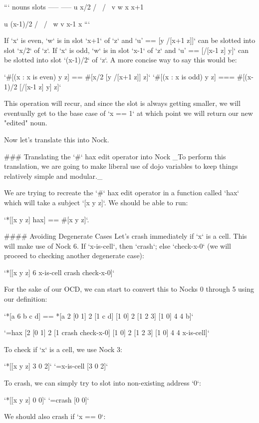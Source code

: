 \documentclass[twoside]{article}
\begin{document}
```
nouns          slots
-----          -----
  u             x/2
 / \            / \ 
v   w          x  x+1

  u           (x-1)/2
 / \            / \
w   v         x-1  x
```

If `x` is even, `w` is in slot `x+1` of `z` and `u' == [y /[x+1 z]]` can be slotted into slot `x/2` of `z`. If `x` is odd, `w` is in slot `x-1` of `z` and `u' == [/[x-1 z] y]` can be slotted into slot `(x-1)/2` of `z`. A more concise way to say this would be:

`#[(x : x is even) y z] == #[x/2 [y /[x+1 z]] z]`  
`#[(x : x is odd) y z] === #[(x-1)/2 [/[x-1 z] y] z]`  

This operation will recur, and since the slot is always getting smaller, we will eventually get to the base case of `x == 1` at which point we will return our new "edited" noun.

Now let's translate this into Nock.

### Translating the `#` hax edit operator into Nock
_To perform this translation, we are going to make liberal use of dojo variables to keep things relatively simple and modular._

We are trying to recreate the `#` hax edit operator in a function called `hax` which will take a subject `[x y z]`.  We should be able to run:

`*[[x y z] hax] == #[x y z]`.


#### Avoiding Degenerate Cases
Let's crash immediately if `x` is a cell. This will make use of Nock 6. If `x-is-cell`, then `crash`; else `check-x-0` (we will proceed to checking another degenerate case):

`*[[x y z] 6 x-is-cell crash check-x-0]`

For the sake of our OCD, we can start to convert this to Nocks 0 through 5 using our definition:

`*[a 6 b c d] == *[a 2 [0 1] 2 [1 c d] [1 0] 2 [1 2 3] [1 0] 4 4 b]`

`=hax [2 [0 1] 2 [1 crash check-x-0] [1 0] 2 [1 2 3] [1 0] 4 4 x-is-cell]`

To check if `x` is a cell, we use Nock 3:

`*[[x y z] 3 0 2]`  
`=x-is-cell [3 0 2]`  

To crash, we can simply try to slot into non-existing address `0`:

`*[[x y z] 0 0]`  
`=crash [0 0]`  

We should also crash if `x == 0`:
\end{document}
